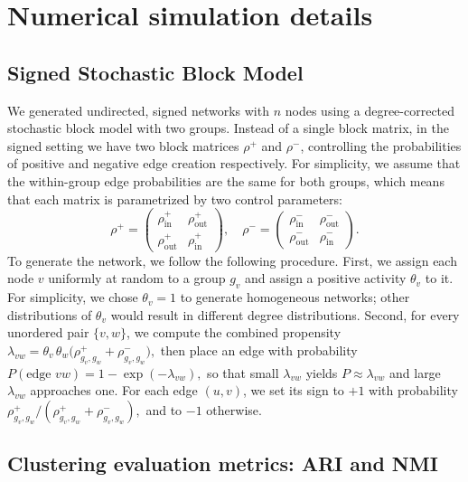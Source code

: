 \documentclass[reprint,onecolumn]{article}
\newcommand{\1}{\mathbb{1}}
\newcommand{\0}{\mathbf{0}}
\begin{document}
\section{Numerical simulation details}  

\subsection{Signed Stochastic Block Model}
\label{app:ssbm}
We generated undirected, signed networks with \(n\) nodes using a degree-corrected stochastic block model with two groups. Instead of a single block matrix, in the signed setting we have two block matrices \(\rho^+\) and \(\rho^-\), controlling the probabilities of positive and negative edge creation respectively. For simplicity, we assume that the within-group edge probabilities are the same for both groups, which means that each matrix is parametrized by two control parameters:
\[
\rho^+
=\begin{pmatrix}
\rho^+_{\mathrm{in}} & \rho^+_{\mathrm{out}}\\[3pt]
\rho^+_{\mathrm{out}} & \rho^+_{\mathrm{in}}
\end{pmatrix},
\quad
\rho^-
=\begin{pmatrix}
\rho^-_{\mathrm{in}} & \rho^-_{\mathrm{out}}\\[3pt]
\rho^-_{\mathrm{out}} & \rho^-_{\mathrm{in}}
\end{pmatrix}.
\]
To generate the network, we follow the following procedure. First, we assign each node \(v\) uniformly at random to a group \(g_v\) and assign a positive activity \(\theta_v\) to it. For simplicity, we chose $\theta_v=1$ to generate homogeneous networks; other distributions of $\theta_v$ would result in different degree distributions. Second, for every unordered pair \(\{v,w\}\), we compute the combined propensity
\(
\lambda_{vw}
=\theta_v\,\theta_w\bigl(\rho^+_{g_v,g_w}+\rho^-_{g_v,g_w}\bigr),
\)
then place an edge with probability
\(
P(\text{edge }vw)
=1-\exp(-\lambda_{vw}),
\)
so that small \(\lambda_{vw}\) yields \(P\approx\lambda_{vw}\) and large \(\lambda_{vw}\) approaches one. For each edge $(u,v)$, we set its sign to \(+1\) with probability
\(
{\rho^+_{g_v,g_w}}/({\rho^+_{g_v,g_w}+\rho^-_{g_v,g_w}}),
\)
and to \(-1\) otherwise.
%

\subsection{Clustering evaluation metrics: ARI and NMI}
\label{app:clustering_metrics}
\end{document}
